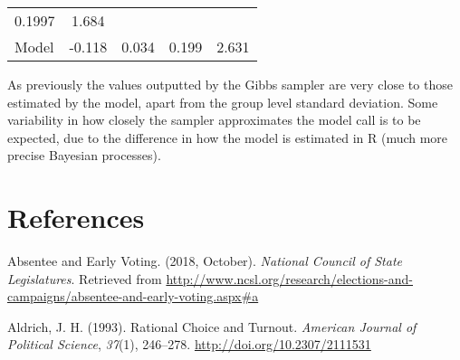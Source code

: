\documentclass[12pt,twoside]{reedthesis}
\begin{document}
\begin{longtable}[]{@{}lcccc@{}}
\begin{minipage}[t]{0.12\columnwidth}
  0.1997\strut
  \end{minipage} & \begin{minipage}[t]{0.12\columnwidth}\centering\strut
  1.684\strut
  \end{minipage}\tabularnewline
  \begin{minipage}[t]{0.25\columnwidth}\raggedright\strut
  Model\strut
  \end{minipage} & \begin{minipage}[t]{0.16\columnwidth}\centering\strut
  -0.118\strut
  \end{minipage} & \begin{minipage}[t]{0.16\columnwidth}\centering\strut
  0.034\strut
  \end{minipage} & \begin{minipage}[t]{0.12\columnwidth}\centering\strut
  0.199\strut
  \end{minipage} & \begin{minipage}[t]{0.12\columnwidth}\centering\strut
  2.631\strut
  \end{minipage}\tabularnewline
  \bottomrule
  \end{longtable}
  
  As previously the values outputted by the Gibbs sampler are very close
  to those estimated by the model, apart from the group level standard
  deviation. Some variability in how closely the sampler approximates the
  model call is to be expected, due to the difference in how the model is
  estimated in R (much more precise Bayesian processes).
  
  \backmatter
  
  \chapter{References}\label{references}
  
  \noindent
  
  \setlength{\parindent}{-0.20in} \setlength{\leftskip}{0.20in}
  \setlength{\parskip}{8pt}
  
  \hypertarget{refs}{}
  \hypertarget{ref-national_council_of_state_legislatures_absentee_2018}{}
  Absentee and Early Voting. (2018, October). \emph{National Council of
  State Legislatures}. Retrieved from
  \url{http://www.ncsl.org/research/elections-and-campaigns/absentee-and-early-voting.aspx\#a}
  
  \hypertarget{ref-aldrich_rational_1993}{}
  Aldrich, J. H. (1993). Rational Choice and Turnout. \emph{American
  Journal of Political Science}, \emph{37}(1), 246--278.
  \url{http://doi.org/10.2307/2111531}
  
\end{document}
